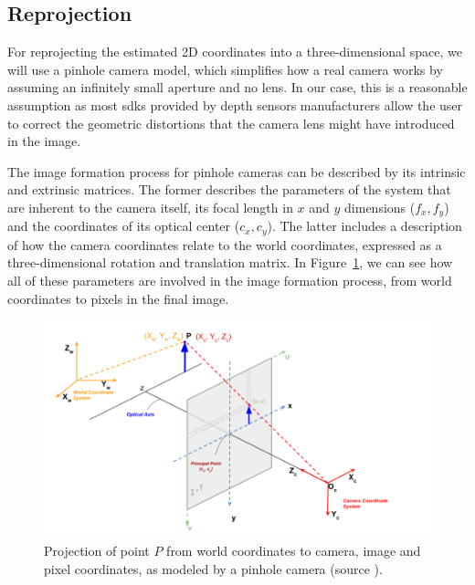 \subsection{Reprojection}\label{subsec:reprojection}
For reprojecting the estimated 2D coordinates into a three-dimensional space, we will use a pinhole camera model, which simplifies how a real camera works by assuming an infinitely small aperture and no lens. In our case, this is a reasonable assumption as most \glspl{sdk} provided by depth sensors manufacturers allow the user to correct the geometric distortions that the camera lens might have introduced in the image.

The image formation process for pinhole cameras can be described by its intrinsic and extrinsic matrices. The former describes the parameters of the system that are inherent to the camera itself, \ie its focal length in \(x\) and \(y\) dimensions (\(f_x, f_y\)) and the coordinates of its optical center (\(c_x, c_y\)). The latter includes a description of how the camera coordinates relate to the world coordinates, expressed as a three-dimensional rotation and translation matrix. In Figure~\ref{fig:projection}, we can see how all of these parameters are involved in the image formation process, from world coordinates to pixels in the final image.

\begin{figure}[h]
    \centering
    \includegraphics[width=\textwidth]{figures/projection.png}
    \caption{Projection of point \(P\) from world coordinates to camera, image and pixel coordinates, as modeled by a pinhole camera (source \cite{mallick_2020}).}
    \label{fig:projection}
\end{figure}

